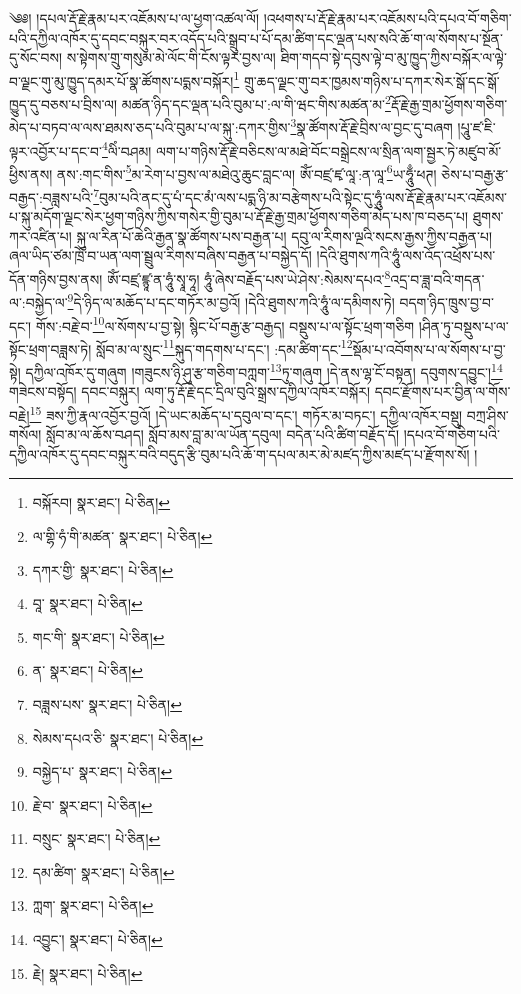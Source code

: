 \setcounter{footnote}{0} 
༄༅། །དཔལ་རྡོ་རྗེ་རྣམ་པར་འཇོམས་པ་ལ་ཕྱག་འཚལ་ལོ། །འཕགས་པ་རྡོ་རྗེ་རྣམ་པར་འཇོམས་པའི་དཔའ་བོ་གཅིག་པའི་དཀྱིལ་འཁོར་དུ་དབང་བསྐུར་བར་འདོད་པའི་སྒྲུབ་པ་པོ་དམ་ཚིག་དང་ལྡན་པས་སའི་ཆོ་ག་ལ་སོགས་པ་སྔོན་དུ་སོང་བས། ས་སྟེགས་གྲུ་གསུམ་མེ་ལོང་གི་ངོས་ལྟར་བྱས་ལ། ཐིག་གདབ་སྟེ་དབུས་ལྟེ་བ་མུ་ཁྱུད་ཀྱིས་བསྐོར་ལ་ལྟེ་བ་ལྗང་གུ་མུ་ཁྱུད་དམར་པོ་སྣ་ཚོགས་པདྨས་བསྐོར།\footnote{བསྐོརབ།  སྣར་ཐང་།  པེ་ཅིན། } གྲུ་ཆད་ལྗང་གུ་བར་ཁྱམས་གཉིས་པ་དཀར་སེར་སྒོ་དང་སྒོ་ཁྱུད་དུ་བཅས་པ་བྲིས་ལ། མཚན་ཉིད་དང་ལྡན་པའི་བུམ་པ་:ལ་གི་ཝང་གིས་མཚན་མ་\footnote{ལ་གྷི་ཧཾ་གི་མཚན་  སྣར་ཐང་།  པེ་ཅིན། }རྡོ་རྗེ་རྒྱ་གྲམ་ཕྱོགས་གཅིག་མེད་པ་བཏབ་ལ་ལས་ཐམས་ཅད་པའི་བུམ་པ་ལ་སྐུ་:དཀར་གྱིས་\footnote{དཀར་གྱི་  སྣར་ཐང་།  པེ་ཅིན། }སྣ་ཚོགས་རྡོ་རྗེ་བྲིས་ལ་བྱང་དུ་བཞག །པཱུ་ཛ་ཇི་ལྟར་འབྱོར་པ་དང་བ་\footnote{བཱ་  སྣར་ཐང་།  པེ་ཅིན། }ལིཾ་བཤམ། ལག་པ་གཉིས་རྡོ་རྗེ་བཅིངས་ལ་མཐེ་བོང་བསྒྲེངས་ལ་སྲིན་ལག་སྦྱར་ཏེ་མཛུབ་མོ་ཕྱིས་ནས། ནས་:གང་གིས་\footnote{གང་གི་  སྣར་ཐང་།  པེ་ཅིན། }མ་རེག་པ་བྱས་ལ་མཐེའུ་ཆུང་བླང་ལ། ཨོཾ་བཛྲ་ཛྭ་ལཱ་:ན་ལཱ་\footnote{ན་  སྣར་ཐང་།  པེ་ཅིན། }ཡ་ཧཱུྃ་ཕཊ། ཅེས་པ་བརྒྱ་རྩ་བརྒྱད་:བཟླས་པའི་\footnote{བཟླས་པས་  སྣར་ཐང་།  པེ་ཅིན། }བུམ་པའི་ནང་དུ་པཾ་དང་མཾ་ལས་པདྨ་ཉི་མ་བརྩེགས་པའི་སྟེང་དུ་ཧཱུཾ་ལས་རྡོ་རྗེ་རྣམ་པར་འཇོམས་པ་སྐུ་མདོག་ལྗང་སེར་ཕྱག་གཉིས་ཀྱིས་གསེར་གྱི་བུམ་པ་རྡོ་རྗེ་རྒྱ་གྲམ་ཕྱོགས་གཅིག་མེད་པས་ཁ་བཅད་པ། ཐུགས་ཀར་འཛིན་པ། སྐུ་ལ་རིན་པོ་ཆེའི་རྒྱན་སྣ་ཚོགས་པས་བརྒྱན་པ། དབུ་ལ་རིགས་ལྔའི་སངས་རྒྱས་ཀྱིས་བརྒྱན་པ། ཞལ་ཡིད་ཙམ་ཁྲོ་བ་ཡན་ལག་སྦྲུལ་རིགས་བཞིས་བརྒྱན་པ་བསྐྱེད་དོ། །དེའི་ཐུགས་ཀའི་ཧཱུཾ་ལས་འོད་འཕྲོས་པས་དོན་གཉིས་བྱས་ནས། ཨོཾ་བཛྲ་ཛྙཱ་ན་ཧཱུཾ་སྭཱ་ཧཱ། ཧཱུཾ་ཞེས་བརྗོད་པས་ཡེ་ཤེས་:སེམས་དཔའ་\footnote{སེམས་དཔའ་ཅི་  སྣར་ཐང་།  པེ་ཅིན། }འདྲ་བ་ཟླ་བའི་གདན་ལ་:བསྐྱེད་ལ་\footnote{བསྐྱེད་པ་  སྣར་ཐང་།  པེ་ཅིན། }དེ་ཉིད་ལ་མཆོད་པ་དང་གཏོར་མ་བྱའོ། །དེའི་ཐུགས་ཀའི་ཧཱུཾ་ལ་དམིགས་ཏེ། བདག་ཉིད་ཁྲུས་བྱ་བ་དང་། གོས་:བརྗེ་བ་\footnote{རྗེ་བ་  སྣར་ཐང་།  པེ་ཅིན། }ལ་སོགས་པ་བྱ་སྟེ། སྙིང་པོ་བརྒྱ་རྩ་བརྒྱད། བསྡུས་པ་ལ་སྟོང་ཕྲག་གཅིག །ཤིན་ཏུ་བསྡུས་པ་ལ་སྟོང་ཕྲག་བཟླས་ཏེ། སློབ་མ་ལ་སྲུང་\footnote{བསྲུང་  སྣར་ཐང་།  པེ་ཅིན། }སྐུད་གདགས་པ་དང་། :དམ་ཚིག་དང་\footnote{དམ་ཚིག་  སྣར་ཐང་།  པེ་ཅིན། }སྡོམ་པ་འབོགས་པ་ལ་སོགས་པ་བྱ་སྟེ། དཀྱིལ་འཁོར་དུ་གཞུག །གཟུངས་ཉི་ཤུ་རྩ་གཅིག་བཀླག་\footnote{ཀླག་  སྣར་ཐང་།  པེ་ཅིན། }ཏུ་གཞུག །དེ་ནས་ལྷ་ངོ་བསྟན། དབུགས་དབྱུང་།\footnote{འབྱུང་།  སྣར་ཐང་།  པེ་ཅིན། } གཟེངས་བསྟོད། དབང་བསྐུར། ལག་ཏུ་རྡོ་རྗེ་དང་དྲིལ་བུའི་སྒྲས་དཀྱིལ་འཁོར་བསྐོར། དབང་རྫོགས་པར་བྱིན་ལ་གོས་བརྗེ།\footnote{རྗེ།  སྣར་ཐང་།  པེ་ཅིན། } ཟས་ཀྱི་རྣལ་འབྱོར་བྱའོ། །དེ་ཡང་མཆོད་པ་དབུལ་བ་དང་། གཏོར་མ་བཏང་། དཀྱིལ་འཁོར་བསྡུ། བཀྲ་ཤིས་གསོལ། སློབ་མ་ལ་ཆོས་བཤད། སློབ་མས་བླ་མ་ལ་ཡོན་དབུལ། བདེན་པའི་ཚིག་བརྗོད་དོ། །དཔའ་བོ་གཅིག་པའི་དཀྱིལ་འཁོར་དུ་དབང་བསྐུར་བའི་བདུད་རྩི་བུམ་པའི་ཆོ་ག་དཔལ་མར་མེ་མཛད་ཀྱིས་མཛད་པ་རྫོགས་སོ། ། 